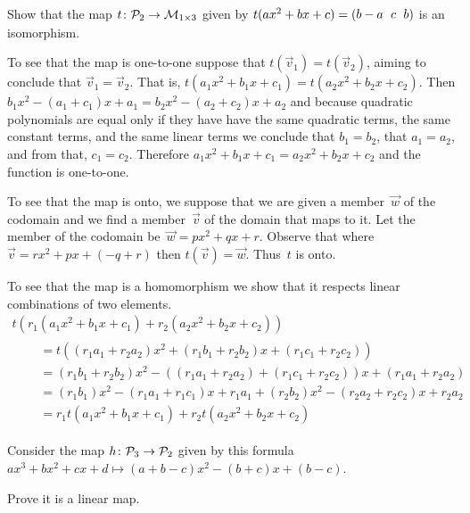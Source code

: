 \documentclass[11pt]{examjh}
\begin{document}
\begin{questions}
\question
Show that the map $\mbox{$t\colon \mathcal{P}_2\to \mathcal{M}_{1\times 3}$}$ given by
$t(ax^2+bx+c)=\rowvec{b-a &c &b}$ is an isomorphism.
\begin{solution}[2.5in]
To see that the map is one-to-one suppose that $t(\vec{v}_1)=t(\vec{v}_2)$,
aiming to conclude that $\vec{v}_1=\vec{v}_2$.
That is, $t(a_1x^2+b_1x+c_1)=t(a_2x^2+b_2x+c_2)$.
Then $b_1x^2-(a_1+c_1)x+a_1=b_2x^2-(a_2+c_2)x+a_2$ and because 
quadratic polynomials
are equal only if they have have the same quadratic terms, the same constant
terms, and the same linear terms we conclude that 
$b_1=b_2$, that $a_1=a_2$, and from that, $c_1=c_2$.
Therefore $a_1x^2+b_1x+c_1=a_2x^2+b_2x+c_2$ and the function is 
one-to-one.

To see that the map is onto, we suppose that we are given a member~$\vec{w}$ 
of the codomain and we find a member~$\vec{v}$ of the domain that maps to
it.
Let the member of the codomain be~$\vec{w}=px^2+qx+r$.
Observe that where $\vec{v}=rx^2+px+(-q+r)$ then $t(\vec{v})=\vec{w}$.
Thus~$t$ is onto.  

To see that the map is a homomorphism we show that it respects linear 
combinations of two elements.
\begin{multline*}
  t(r_1(a_1x^2+b_1x+c_1)+r_2(a_2x^2+b_2x+c_2))              \\ 
  \begin{split} \quad 
  &=t((r_1a_1+r_2a_2)x^2+(r_1b_1+r_2b_2)x+(r_1c_1+r_2c_2))   \\
  &=(r_1b_1+r_2b_2)x^2-((r_1a_1+r_2a_2)+(r_1c_1+r_2c_2))x+(r_1a_1+r_2a_2)  \\
  &=(r_1b_1)x^2-(r_1a_1+r_1c_1)x+r_1a_1
     +(r_2b_2)x^2-(r_2a_2+r_2c_2)x+r_2a_2                       \\
  &=r_1t(a_1x^2+b_1x+c_1)+r_2t(a_2x^2+b_2x+c_2)
  \end{split}
\end{multline*}
\end{solution}



\question
Consider the map $\mbox{$h\colon \mathcal{P}_3\to \mathcal{P}_2$}$
given by this formula
$ax^3+bx^2+cx+d \mapsto (a+b-c)x^2-(b+c)x+(b-c)$.
\begin{parts}
\item Prove it is a linear map.
\begin{solution}[2.25in]


\end{solution}
\end{parts}
\end{questions}
\end{document}
